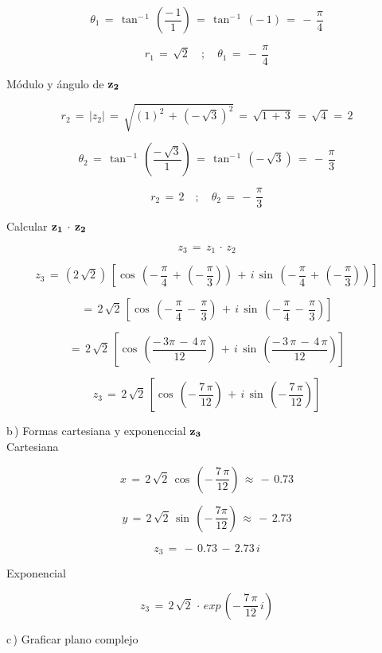 \documentclass[a4paper,11pt,openany]{book}
\begin{document}
$$\theta_{1}\,=\,\tan^{-\,1}\,\left(\dfrac{-\,1}{1}\right)\,=\,\tan^{-\,1}\,(-\,1)\,=\,-\,\dfrac{\pi}{4}$$

$$\boxed{r_{1}\,=\,\sqrt{2} \quad;\quad \theta_{1}\,=\,-\,\dfrac{\pi}{4}}$$

\textcolor{ao(english)}{} Módulo y ángulo de $\bf{z_{2}}$ 

$$r_{2}\,=\,|z_{2}|\,=\,\sqrt{(1)^{2}\,+\,\left(-\,\sqrt{3}\right)^{2}}\,=\,\sqrt{1\,+\,3}\,=\,\sqrt{4\,}=\,2$$

$$\theta_{2}\,=\,\tan^{-\,1}\,\left(\dfrac{-\,\sqrt{3}}{1}\right)\,=\,\tan^{-\,1}\,(-\,\sqrt{3})\,=\,-\,\dfrac{\pi}{3}$$

$$\boxed{r_{2}\,=\,2 \quad;\quad \theta_{2}\,=\,-\,\dfrac{\pi}{3}}$$

\textcolor{ao(english)}{} Calcular $\bf{z_{1}\,\cdot\,z_{2}}$

$$z_{3}\,=\,z_{1}\,\cdot\,z_{2}$$

$$z_{3}\,=\,\left(2\,\sqrt{2}\right)\,\left[\cos\,\left(-\,\dfrac{\pi}{4}\,+\,\left(-\,\dfrac{\pi}{3}\right)\right)\,+\,i\,\sin\,\left(-\,\dfrac{\pi}{4}\,+\,\left(-\,\dfrac{\pi}{3}\right)\right)\right]$$

$$=\,2\,\sqrt{2}\,\left[\cos\,\left(-\,\dfrac{\pi}{4}\,-\,\dfrac{\pi}{3}\right)\,+\,i\,\sin\,\left(-\,\dfrac{\pi}{4}\,-\,\dfrac{\pi}{3}\right)\right]$$

$$=\,2\,\sqrt{2}\,\left[\cos\,\left(\dfrac{-\,3\pi\,-\,4\,\pi}{12}\right)\,+\,i\,\sin\,\left(\dfrac{-\,3\,\pi\,-\,4\,\pi}{12}\right)\right]$$

$$z_{3}\,=\,2\,\sqrt{2}\,\left[\cos\,\left(-\,\dfrac{7\,\pi}{12}\right)\,+\,i\,\sin\,\left(-\,\dfrac{7\,\pi}{12}\right)\right]$$

\textcolor{ao(english)}{b\,)} Formas cartesiana y exponenccial $\bf{z_{3}}$\\

\textcolor{ao(english)}{} Cartesiana

$$x\,=\,2\,\sqrt{2}\,\cos\,\left(-\,\dfrac{7\,\pi}{12}\right)\,\approx\,-\,0.73$$

$$y\,=\,2\,\sqrt{2}\,\sin\,\left(-\,\dfrac{7\pi}{12}\right)\,\approx\,-\,2.73$$

$$z_{3}\,=\,-\,0.73\,-\,2.73\,i$$

\textcolor{ao(english)}{} Exponencial

$$z_{3}\,=\,2\,\sqrt{2}\,\cdot\,exp\,\left(-\,\dfrac{7\,\pi}{12}\,i\right)$$

\textcolor{ao(english)}{c\,)} Graficar plano complejo\\
\end{document}
